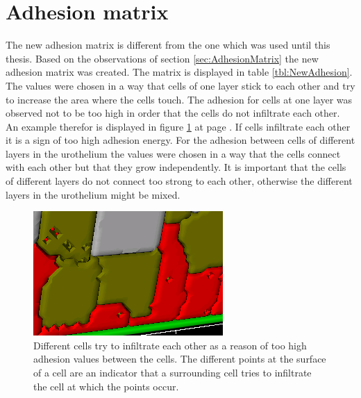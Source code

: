 \section{Adhesion matrix}
The new adhesion matrix is different from the one which was used until this thesis. Based on the observations of section \ref{sec:AdhesionMatrix} the new adhesion matrix was created. The matrix is displayed in table \ref{tbl:NewAdhesion}. The values were chosen in a way that cells of one layer stick to each other and try to increase the area where the cells touch. The adhesion for cells at one layer was observed not to be too high in order that the cells do not infiltrate each other. An example therefor is displayed in figure \ref{img:InfiltratingCells} at page \pageref{img:InfiltratingCells}. If cells infiltrate each other it is a sign of too high adhesion energy. For the adhesion between cells of different layers in the urothelium the values were chosen in a way that the cells connect with each other but that they grow independently. It is important that the cells of different layers do not connect too strong to each other, otherwise the different layers in the urothelium might be mixed. 
\begin{figure}[ht]
	\center
	\includegraphics[scale=1.2]{figures/TooHighAdhesion1.png}
	\caption[Different cells try to infiltrate each other]{Different cells try to infiltrate each other as a reason of too high adhesion values between the cells. The different points at the surface of a cell are an indicator that a surrounding cell tries to infiltrate the cell at which the points occur.}
	\label{img:InfiltratingCells}
\end{figure}


